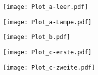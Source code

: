 

\pagestyle{empty}



\centering

\texttt{[image: Plot\_a-leer.pdf]}

\texttt{[image: Plot\_a-Lampe.pdf]}

\texttt{[image: Plot\_b.pdf]}

\texttt{[image: Plot\_c-erste.pdf]}

\texttt{[image: Plot\_c-zweite.pdf]}



